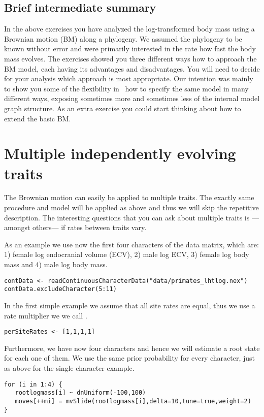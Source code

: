 \subsection{Brief intermediate summary}
In the above exercises you have analyzed the log-transformed body mass using a Brownian motion (BM) along a phylogeny. We assumed the phylogeny to be known without error and were primarily interested in the rate how fast the body mass evolves. The exercises showed you three different ways how to approach the BM model, each having its advantages and disadvantages. You will need to decide for your analysis which approach is most appropriate. Our intention was mainly to show you some of the flexibility in \RevBayes~how to specify the same model in many different ways, exposing sometimes more and sometimes less of the internal model graph structure. As an extra exercise you could start thinking about how to extend the basic BM.



\vspace{5cm}


\section{Multiple independently evolving traits}
The Brownian motion can easily be applied to multiple traits. The exactly same procedure and model will be applied as above and thus we will skip the repetitive description. The interesting questions that you can ask about multiple traits is ---amongst others--- if rates between traits vary.


As an example we use now the first four characters of the data matrix, which are: 1) female log endocranial volume (ECV), 2) male log ECV, 3) female log body mass and 4) male log body mass.
{\tt \small \begin{snugshade*}
\begin{lstlisting}
contData <- readContinuousCharacterData("data/primates_lhtlog.nex")
contData.excludeCharacter(5:11)
\end{lstlisting}
\end{snugshade*}}
In the first simple example we assume that all site rates are equal, thus we use a rate multiplier we we call .
{\tt \small \begin{snugshade*}
\begin{lstlisting}
perSiteRates <- [1,1,1,1]
\end{lstlisting}
\end{snugshade*}}
Furthermore, we have now four characters and hence we will estimate a root state for each one of them. We use the same prior probability for every character, just as above for the single character example.
{\tt \small \begin{snugshade*}
\begin{lstlisting}
for (i in 1:4) {
   rootlogmass[i] ~ dnUniform(-100,100)
   moves[++mi] = mvSlide(rootlogmass[i],delta=10,tune=true,weight=2) 
}
\end{lstlisting}
\end{snugshade*}}


